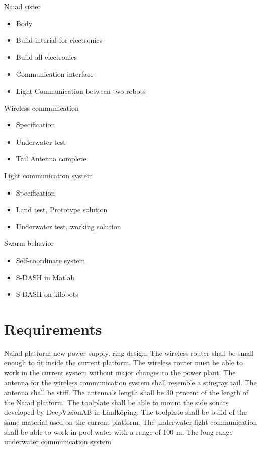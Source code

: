 \documentclass[cleardoublepage=plain]{scrartcl}
\begin{document}
Naiad sister
\begin{itemize}
\item Body
\item Build interial for electronics
\item Build all electronics
\item Communication interface
\item Light Communication between two robots
\end{itemize}

Wireless communication
\begin{itemize}
\item Specification
\item Underwater test
\item Tail Antenna complete
\end{itemize}

Light communication system
\begin{itemize}
\item Specification
\item Land test, Prototype solution
\item Underwater test, working solution
\end{itemize}

Swarm behavior
\begin{itemize}
\item Self-coordinate system
\item S-DASH in Matlab
\item S-DASH on kilobots
\end{itemize}



\section{Requirements}\label{sec:Requirements} 
Naiad platform new power supply, ring design.%
The wireless router shall be small enough to fit inside the current platform.
The wireless router must be able to work in the current system without major changes to the power plant.
The antenna for the wireless communication system shall resemble a stingray tail.
The antenna shall be stiff.
The antenna's length shall be 30 procent of the length of the Naiad platform.
The toolplate shall be able to mount the side sonars developed by DeepVisionAB in Lindköping.
The toolplate shall be build of the same material used on the current platform.
The underwater light communication shall be able to work in pool water with a range of 100 m.
The long range underwater communication system 
\end{document}
